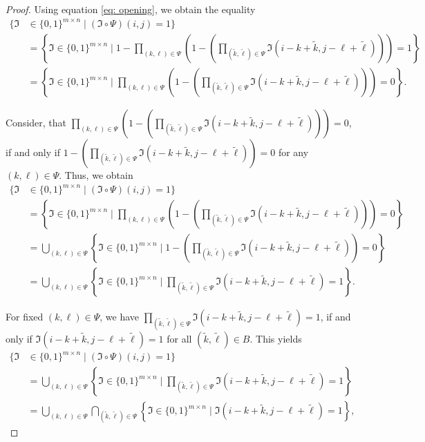 \documentclass[a4paper,12pt]{article}
\theoremstyle{plain}
\theoremstyle{definition}
\begin{document}
\begin{proof}
	Using equation \eqref{eq: opening}, we obtain the equality
	\begin{align*}
		\big\{ \mathfrak{I} &\in \{ 0, 1 \}^{m \times n} \mid (\mathfrak{I} \circ \Psi)(i, j) = 1 \big\} \\
		&= \left\{ \mathfrak{I} \in \{ 0, 1 \}^{m \times n} \mid 1 - \prod_{(k, \ell) \in \Psi} \left( 1 - \left( \prod_{(\tilde{k}, \tilde{\ell}) \in \Psi} \mathfrak{I}(i - k + \tilde{k}, j - \ell + \tilde{\ell}) \right) \right) = 1 \right\} \\
		&= \left\{ \mathfrak{I} \in \{ 0, 1 \}^{m \times n} \mid \prod_{(k, \ell) \in \Psi} \left( 1 - \left( \prod_{(\tilde{k}, \tilde{\ell}) \in \Psi} \mathfrak{I}(i - k + \tilde{k}, j - \ell + \tilde{\ell}) \right) \right) = 0 \right\}.
	\end{align*}
	
	Consider, that $\prod_{(k, \ell) \in \Psi} \left( 1 - \left( \prod_{(\tilde{k}, \tilde{\ell}) \in \Psi} \mathfrak{I}(i - k + \tilde{k}, j - \ell + \tilde{\ell}) \right) \right) = 0$, if and only if $1 - \left( \prod_{(\tilde{k}, \tilde{\ell}) \in \Psi} \mathfrak{I}(i - k + \tilde{k}, j - \ell + \tilde{\ell}) \right) = 0$ for any $(k, \ell) \in \Psi$. Thus, we obtain
	\begin{align*}
		\big\{ \mathfrak{I} &\in \{ 0, 1 \}^{m \times n} \mid (\mathfrak{I} \circ \Psi)(i, j) = 1 \big\} \\
		&= \left\{ \mathfrak{I} \in \{ 0, 1 \}^{m \times n} \mid \prod_{(k, \ell) \in \Psi} \left( 1 - \left( \prod_{(\tilde{k}, \tilde{\ell}) \in \Psi} \mathfrak{I}(i - k + \tilde{k}, j - \ell + \tilde{\ell}) \right) \right) = 0 \right\} \\
		&= \bigcup_{(k, \ell) \in \Psi} \left\{ \mathfrak{I} \in \{ 0, 1 \}^{m \times n} \mid 1 - \left( \prod_{(\tilde{k}, \tilde{\ell}) \in \Psi} \mathfrak{I}(i - k + \tilde{k}, j - \ell + \tilde{\ell}) \right) = 0 \right\} \\
		&= \bigcup_{(k, \ell) \in \Psi} \left\{ \mathfrak{I} \in \{ 0, 1 \}^{m \times n} \mid \prod_{(\tilde{k}, \tilde{\ell}) \in \Psi} \mathfrak{I}(i - k + \tilde{k}, j - \ell + \tilde{\ell}) = 1 \right\}.
	\end{align*}
	
	For fixed $(k, \ell) \in \Psi$, we have $\prod_{(\tilde{k}, \tilde{\ell}) \in \Psi} \mathfrak{I}(i - k + \tilde{k}, j - \ell + \tilde{\ell}) = 1$, if and only if $\mathfrak{I}(i - k + \tilde{k}, j - \ell + \tilde{\ell}) = 1$ for all $(\tilde{k}, \tilde{\ell}) \in B$. This yields
	\begin{align*}
		\big\{ \mathfrak{I} &\in \{ 0, 1 \}^{m \times n} \mid (\mathfrak{I} \circ \Psi)(i, j) = 1 \big\} \\
		&= \bigcup_{(k, \ell) \in \Psi} \left\{ \mathfrak{I} \in \{ 0, 1 \}^{m \times n} \mid \prod_{(\tilde{k}, \tilde{\ell}) \in \Psi} \mathfrak{I}(i - k + \tilde{k}, j - \ell + \tilde{\ell}) = 1 \right\} \\
		&= \bigcup_{(k, \ell) \in \Psi} \bigcap_{(\tilde{k}, \tilde{\ell}) \in \Psi} \left\{ \mathfrak{I} \in \{ 0, 1 \}^{m \times n} \mid \mathfrak{I}(i - k + \tilde{k}, j - \ell + \tilde{\ell}) = 1 \right\},
	\end{align*}
	

\end{proof}
\end{document}
